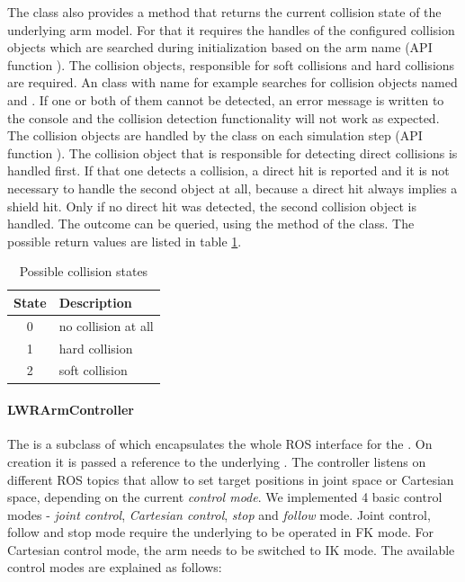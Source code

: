 The  class also provides a method that returns the current collision state of the underlying arm model. For that it requires the handles of the configured collision objects which are searched during initialization based on the arm name (API function ). The collision objects, responsible for soft collisions and hard collisions are required. An  class with name  for example searches for collision objects named  and . If one or both of them cannot be detected, an error message is written to the console and the collision detection functionality will not work as expected. The collision objects are handled by the  class on each simulation step (API function ). The collision object that is responsible for detecting direct collisions is handled first. If that one detects a collision, a direct hit is reported and it is not necessary to handle the second object at all, because a direct hit always implies a shield hit. Only if no direct hit was detected, the second collision object is handled. The outcome can be queried, using the method  of the  class. The possible return values are listed in table \ref{tbl:col_states}. \\

\begin{table}[h]
  \centering
  \begin{tabular}{|c|l|} \hline
	\textbf{State} & \textbf{Description} \\ \hline
	0 & no collision at all \\
	1 & hard collision \\
	2 & soft collision \\ \hline
  \end{tabular}
  \caption{Possible collision states}
  \label{tbl:col_states}
\end{table}

\paragraph{LWRArmController}

The  is a subclass of  which encapsulates the whole ROS interface for the . On creation it is passed a reference to the underlying . The controller listens on different ROS topics that allow to set target positions in joint space or Cartesian space, depending on the current \emph{control mode}. We implemented 4 basic control modes - \emph{joint control}, \emph{Cartesian control}, \emph{stop} and \emph{follow} mode. Joint control, follow and stop mode require the underlying  to be operated in FK mode. For Cartesian control mode, the arm needs to be switched to IK mode. The available control modes are explained as follows:


